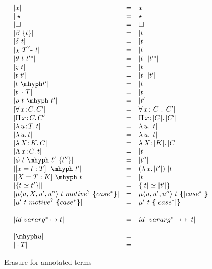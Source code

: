 \documentclass{article}
\newcommand{\abs}[4]{{#1}\, #2\! : \! #3.\, #4}
\newcommand{\absu}[3]{{#1}\, #2.\, #3}
\begin{document}
\begin{figure}[h]
  \[
  \begin{array}{lll}
       |x| & = & x 
    \\ |\star| & = & \star 
    \\ |\Box| & = & \Box 
    \\ |\beta\ \{t\}| & = & |t|
    \\ |\delta\ t| & = & |t|
    \\ |\chi\ T^? \textbf{-}\ t| & = & |t| 
    \\ |\theta\ t\ t'^*| & = & |t|\ |t'^*| 
    \\ |\varsigma\ t| & = & |t|
    \\ |t\ t'| & = & |t|\ |t'|
    \\ |t\ \mhyph t'| & = & |t| 
    \\ |t\ \cdot T| & = & |t| 
    \\ |\rho\ t\ \mhyph\ t'| & = & |t'| 
    \\ |\abs{\forall}{x}{C}{C'}| & = & \abs{\forall}{x}{|C|}{|C'|}
    \\ |\abs{\Pi}{x}{C}{C'}| & = & \abs{\Pi}{x}{|C|}{|C'|}
    \\ |\abs{\lambda}{u}{T}{t}| & = &  \absu{\lambda}{u}{|t|} 
    \\ |\absu{\lambda}{u}{t}| & = &  \absu{\lambda}{u}{|t|} 
    \\ |\abs{\lambda}{X}{K}{C}| & = &  \abs{\lambda}{X}{|K|}{|C|} 
    \\ |\abs{\Lambda}{x}{C}{t}| & = &  |t| 
    \\ |\phi\ t\ \mhyph\ t'\ \{t''\}| & = & |t''| 
    \\ |[ x = t : T]|\ \mhyph\ t' | & = & (\absu{\lambda}{x}{|t'|})\ |t|
    \\ |[X = T : K]\ \mhyph\ t | & = & |t| 
    \\ |\{ t \simeq t' \}|| & = & \{ |t| \simeq |t'| \}
    \\ |\mu\langle u,X,u',u'' \rangle\ t\ motive^?\ \textbf{\{} case^* \textbf{\}}|
           & = & \mu\langle u,u',u'' \rangle\ t\ \textbf{\{}|case^*|\textbf{\}}
    \\ |\mu'\ t\ motive^?\ \textbf{\{} case^* \textbf{\}}| & = & \mu'\ t\
       \textbf{\{}|case^*|\textbf{\}}
    \\ \\ |id\ vararg^* \mapsto t| & = & id\ |vararg^*|\ \mapsto |t|
    \\ 
    \\ |\mhyph u| & = & 
    \\ |\cdot T|  & = &
  \end{array}
  \]
  \caption{Erasure for annotated terms}
  \label{fig:eraser}
\end{figure}
\end{document}
